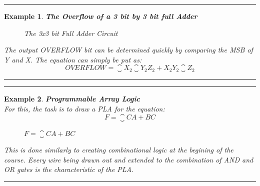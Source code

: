 \documentclass[12pt]{article}
\newtheorem{example}{Example}
\newenvironment{examp}
{
	\vspace{.5cm}
	\hrule
\begin{example}\upshape}
	{\hrule
		\vspace{0.5cm}
\end{example}}
\begin{document}
\begin{examp}
	\vspace{.5mm}
	\textbf{The Overflow of a 3 bit by 3 bit full Adder}\\
	\begin{figure}[H]
		\caption{The 3x3 bit Full Adder Circuit}
	\end{figure}
	
	The output OVERFLOW bit can be determined quickly by comparing the MSB of Y and
	X. The equation can simply be put as:
	\[
		OVERFLOW = \closure{X_2}\closure{Y_2}Z_2 + X_{2}Y_{2}\closure{Z_{2}}
	\]
	
\end{examp}
\begin{examp}
	\vspace{.5mm}
	\textbf{Programmable Array Logic}\\
	For this, the task is to draw a PLA for the equation:
	\[
		F = \closure{C}A + BC
	\]
	\begin{figure}[H]
		\caption{$F = \closure{C}A + BC$}
	\end{figure}
	This is done similarly to creating combinational logic at the begining of the
	course. Every wire being drawn out and extended to the combination of AND and
	OR gates is the characteristic of the PLA.
	
\end{examp}
\end{document}

